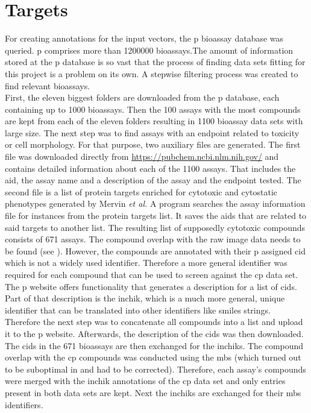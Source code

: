 \section{Targets}\label{sec:targets}
For creating annotations for the input vectors, the \acl{p} bioassay database was queried. \acl{p} comprises more than \num{1200000} bioassays.\cite{Pubchem2021}The amount of information stored at the \acl{p} database is so vast that the process of finding data sets fitting for this project is a problem on its own. A stepwise filtering process was created to find relevant bioassays.\\
First, the eleven biggest folders are downloaded from the \acl{p} database, each containing up to \num{1000} bioassays.\cite{PubchemDB2021} Then the \num{100} assays with the most compounds are kept from each of the eleven folders resulting in \num{1100} bioassay data sets with large size. The next step was to find assays with an endpoint related to toxicity or cell morphology. For that purpose, two auxiliary files are generated. The first file was downloaded directly from \url{https://pubchem.ncbi.nlm.nih.gov/} and contains detailed information about each of the \num{1100} assays. That includes the \ac{aid}, the assay name and a description of the assay and the endpoint tested. The second file is a list of protein targets enriched for cytotoxic and cytostatic phenotypes generated by Mervin \textit{et al.}\cite{Mervin2016} A program searches the assay information file for instances from the protein targets list. It saves the \ac{aid}s that are related to said targets to another list. The resulting list of supposedly cytotoxic compounds consists of \num{671} assays. The compound overlap with the raw image data needs to be found (see ). However, the compounds are annotated with their \acl{p} assigned \ac{cid} which is not a widely used identifier. Therefore a more general identifier was required for each compound that can be used to screen against the \ac{cp} data set. The \acl{p} website offers functionality that generates a description for a list of \ac{cid}s. Part of that description is the \ac{inchik}, which is a much more general, unique identifier that can be translated into other identifiers like \ac{smiles} strings. Therefore the next step was to concatenate all compounds into a list and upload it to the \acl{p} website. Afterwards, the description of the \ac{cid}s was then downloaded. The \ac{cid}s in the \num{671} bioassays are then exchanged for the \ac{inchik}s. The compound overlap with the \ac{cp} compounds was conducted using the \acl{mbs} (which turned out to be suboptimal in  and had to be corrected). Therefore, each assay's compounds were merged with the \ac{inchik} annotations of the \ac{cp} data set and only entries present in both data sets are kept. Next the \ac{inchik}s are exchanged for their \acl{mbs} identifiers.\\
